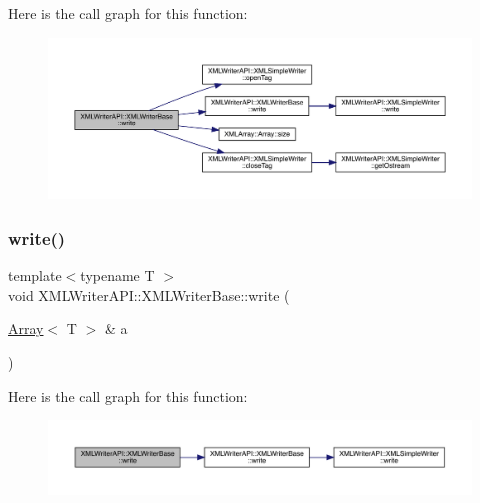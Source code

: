 Here is the call graph for this function\+:
\nopagebreak
\begin{figure}[H]
\begin{center}
\leavevmode
\includegraphics[width=350pt]{d5/df5/classXMLWriterAPI_1_1XMLWriterBase_a85d9236f5ec6ccc3c8559d4ec431bf6b_cgraph}
\end{center}
\end{figure}
\mbox{\label{classXMLWriterAPI_1_1XMLWriterBase_a5475e21d716c65a21d620b4cde0c9ca1}} 
\subsubsection{\texorpdfstring{write()}{write()}\hspace{0.1cm}{\footnotesize\ttfamily [37/39]}}
{\footnotesize\ttfamily template$<$typename T $>$ \\
void X\+M\+L\+Writer\+A\+P\+I\+::\+X\+M\+L\+Writer\+Base\+::write (\begin{DoxyParamCaption}\item[{\mbox{\hyperlink{classXMLArray_1_1Array}{Array}}$<$ T $>$ \&}]{a }\end{DoxyParamCaption})\hspace{0.3cm}{\ttfamily [inline]}}

Here is the call graph for this function\+:
\nopagebreak
\begin{figure}[H]
\begin{center}
\leavevmode
\includegraphics[width=350pt]{d5/df5/classXMLWriterAPI_1_1XMLWriterBase_a5475e21d716c65a21d620b4cde0c9ca1_cgraph}
\end{center}
\end{figure}
\mbox{\label{classXMLWriterAPI_1_1XMLWriterBase_a5475e21d716c65a21d620b4cde0c9ca1}} 
